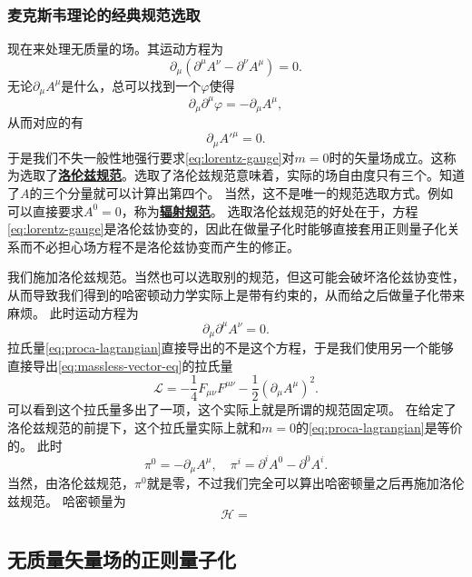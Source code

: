 \documentclass[hyperref, UTF8, a4paper]{ctexart}
\newcommand{\concept}[1]{\underline{\textbf{#1}}}
\begin{document}
\subsubsection{麦克斯韦理论的经典规范选取}

现在来处理无质量的场。其运动方程为
\[
    \partial_\mu (\partial^\mu A^\nu - \partial^\nu A^\mu) = 0.
\]
无论$\partial_\mu A^\mu$是什么，总可以找到一个$\varphi$使得
\[
    \partial_\mu \partial^\mu \varphi = - \partial_\mu A^\mu,
\]
从而对应的有
\[
    \partial_\mu {A'}^\mu = 0.
\]
于是我们不失一般性地强行要求\eqref{eq:lorentz-gauge}对$m=0$时的矢量场成立。这称为选取了\concept{洛伦兹规范}。选取了洛伦兹规范意味着，实际的场自由度只有三个。知道了$A$的三个分量就可以计算出第四个。
当然，这不是唯一的规范选取方式。例如可以直接要求$A^0 = 0$，称为\concept{辐射规范}。
选取洛伦兹规范的好处在于，方程\eqref{eq:lorentz-gauge}是洛伦兹协变的，因此在做量子化时能够直接套用正则量子化关系而不必担心场方程不是洛伦兹协变而产生的修正。

我们施加洛伦兹规范。当然也可以选取别的规范，但这可能会破坏洛伦兹协变性，从而导致我们得到的哈密顿动力学实际上是带有约束的，从而给之后做量子化带来麻烦。
此时运动方程为
\begin{equation}
    \partial_\mu \partial^\mu A^\nu = 0.
    \label{eq:massless-vector-eq}
\end{equation}
拉氏量\eqref{eq:proca-lagrangian}直接导出的不是这个方程，于是我们使用另一个能够直接导出\eqref{eq:massless-vector-eq}的拉氏量
\begin{equation}
    \mathcal{L} = - \frac{1}{4} F_{\mu \nu} F^{\mu \nu} - \frac{1}{2} (\partial_\mu A^\mu)^2.
    \label{eq:maxwell-lagrangian-fixed}
\end{equation}
可以看到这个拉氏量多出了一项，这个实际上就是所谓的规范固定项。
在给定了洛伦兹规范的前提下，这个拉氏量实际上就和$m=0$的\eqref{eq:proca-lagrangian}是等价的。
此时
\begin{equation}
    \pi^0 = -\partial_\mu A^\mu, \quad \pi^i = \partial^i A^0 - \partial^0 A^i.
\end{equation}
当然，由洛伦兹规范，$\pi^0$就是零，不过我们完全可以算出哈密顿量之后再施加洛伦兹规范。
哈密顿量为 %
\begin{equation}
    \mathcal{H} = 
\end{equation}

\subsection{无质量矢量场的正则量子化}
\end{document}
